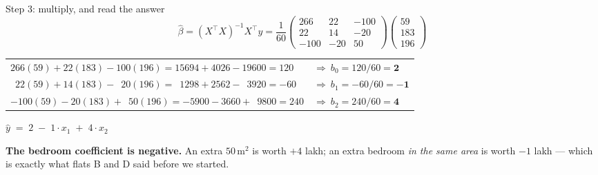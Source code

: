 \documentclass[aspectratio=169]{beamer}
\newcommand{\Xt}{X^{\!\top}}
\begin{document}
\begin{frame}[shrink=6]{Step 3: multiply, and read the answer}
  \[
    \hat\beta = (\Xt X)^{-1}\Xt y = \frac{1}{60}
    \begin{pmatrix} 266 & 22 & -100\\ 22 & 14 & -20\\ -100 & -20 & 50
    \end{pmatrix}
    \begin{pmatrix} 59\\183\\196 \end{pmatrix}
  \]
  \begin{center}\small
  \begin{tabular}{@{}ll@{}}
    \toprule
    $266(59) + 22(183) - 100(196) = 15694 + 4026 - 19600 = 120$ &
      $\Rightarrow\ b_0 = 120/60 = \mathbf{2}$\\
    $\phantom{2}22(59) + 14(183) - \phantom{1}20(196) = \phantom{1}1298 + 2562 - \phantom{1}3920 = -60$ &
      $\Rightarrow\ b_1 = -60/60 = \mathbf{-1}$\\
    $-100(59) - 20(183) + \phantom{1}50(196) = -5900 - 3660 + \phantom{1}9800 = 240$ &
      $\Rightarrow\ b_2 = 240/60 = \mathbf{4}$\\
    \bottomrule
  \end{tabular}
  \end{center}
  \begin{exampleblock}{}
    \centering\large
    $\hat y \;=\; 2 \;-\; 1\cdot x_1 \;+\; 4\cdot x_2$
  \end{exampleblock}
  \begin{center}\small
    \textbf{The bedroom coefficient is negative.} An extra $50\,\mathrm{m}^2$
    is worth $+4$ lakh; an extra bedroom \emph{in the same area} is worth
    $-1$ lakh --- which is exactly what flats B and D said before we started.
  \end{center}
\end{frame}
\end{document}
